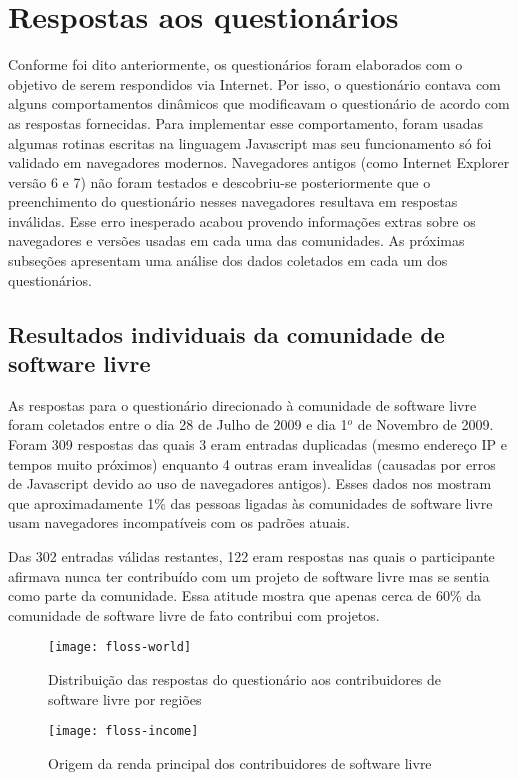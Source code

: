 \section{Respostas aos questionários}
\label{sec:respostas}

Conforme foi dito anteriormente, os questionários foram elaborados com
o objetivo de serem respondidos via Internet. Por isso, o questionário
contava com alguns comportamentos dinâmicos que modificavam o
questionário de acordo com as respostas fornecidas. Para implementar
esse comportamento, foram usadas algumas rotinas escritas na linguagem
Javascript mas seu funcionamento só foi validado em navegadores
modernos. Navegadores antigos (como Internet Explorer versão 6 e 7)
não foram testados e descobriu-se posteriormente que o preenchimento
do questionário nesses navegadores resultava em respostas
inválidas. Esse erro inesperado acabou provendo informações extras
sobre os navegadores e versões usadas em cada uma das comunidades. As
próximas subseções apresentam uma análise dos dados coletados em cada
um dos questionários.

\subsection{Resultados individuais da comunidade de software livre}
\label{sec:resp-floss}

As respostas para o questionário direcionado à comunidade de software
livre foram coletados entre o dia 28 de Julho de 2009 e dia 1$^o$ de
Novembro de 2009. Foram 309 respostas das quais 3 eram entradas
duplicadas (mesmo endereço IP e tempos muito próximos) enquanto 4
outras eram invealidas (causadas por erros de Javascript devido ao uso
de navegadores antigos). Esses dados nos mostram que aproximadamente
1\% das pessoas ligadas às comunidades de software livre usam
navegadores incompatíveis com os padrões atuais.

Das 302 entradas válidas restantes, 122 eram respostas nas quais o
participante afirmava nunca ter contribuído com um projeto de software
livre mas se sentia como parte da comunidade. Essa atitude mostra que
apenas cerca de 60\% da comunidade de software livre de fato contribui
com projetos.

\begin{figure}[htb]
  \begin{minipage}[t]{0.55\linewidth}
    \centering
    \texttt{[image: floss-world]}
    \caption{Distribuição das respostas do questionário aos
      contribuidores de software livre por regiões}
    \label{fig:floss-world}
  \end{minipage}
  \begin{minipage}[t]{0.45\linewidth}
    \centering
    \texttt{[image: floss-income]}
    \caption{Origem da renda principal dos contribuidores de software
      livre}
    \label{fig:floss-income}
  \end{minipage}
\end{figure}

